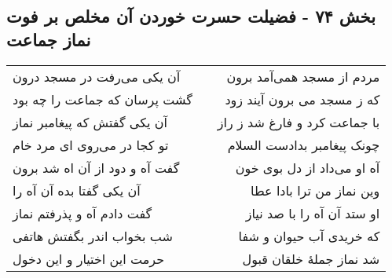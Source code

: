 \begin{center}
\section*{بخش ۷۴ - فضیلت حسرت خوردن آن مخلص بر فوت نماز  جماعت}
\label{sec:sh074}
\begin{longtable}{l p{0.5cm} r}
آن یکی می‌رفت در مسجد درون
&&
مردم از مسجد همی‌آمد برون
\\
گشت پرسان که جماعت را چه بود
&&
که ز مسجد می برون آیند زود
\\
آن یکی گفتش که پیغامبر نماز
&&
با جماعت کرد و فارغ شد ز راز
\\
تو کجا در می‌روی ای مرد خام
&&
چونک پیغامبر بدادست السلام
\\
گفت آه و دود از آن اه شد برون
&&
آه او می‌داد از دل بوی خون
\\
آن یکی گفتا بده آن آه را
&&
وین نماز من ترا بادا عطا
\\
گفت دادم آه و پذرفتم نماز
&&
او ستد آن آه را با صد نیاز
\\
شب بخواب اندر بگفتش هاتفی
&&
که خریدی آب حیوان و شفا
\\
حرمت این اختیار و این دخول
&&
شد نماز جملهٔ خلقان قبول
\\
\end{longtable}
\end{center}
